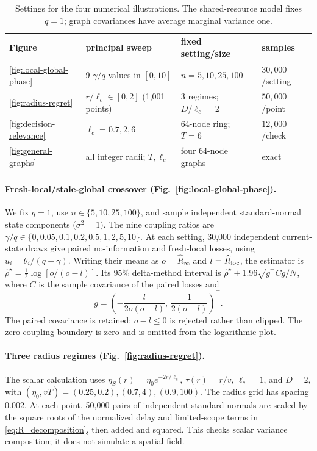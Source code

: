 \begin{table}[H]
\centering
\caption{Settings for the four numerical illustrations. The shared-resource
model fixes $q=1$; graph covariances have average marginal variance one.}
\label{tab:numerical-parameters}
\small
\begin{tabular}{llll}
\toprule
Figure & principal sweep & fixed setting/size & samples \\
\midrule
\ref{fig:local-global-phase} & 9 $\gamma/q$ values in $[0,10]$ & $n=5,10,25,100$ & $30{,}000$/setting \\
\ref{fig:radius-regret} & $r/\ell_c\in[0,2]$ (1,001 points) & 3 regimes; $D/\ell_c=2$ & $50{,}000$/point \\
\ref{fig:decision-relevance} & $\ell_c=0.7,2,6$ & 64-node ring; $T=6$ & $12{,}000$/check \\
\ref{fig:general-graphs} & all integer radii; $T,\ell_c$ & four 64-node graphs & exact \\
\bottomrule
\end{tabular}
\end{table}

\paragraph{Fresh-local/stale-global crossover (Fig.~\ref{fig:local-global-phase}).}
We fix $q=1$, use $n\in\{5,10,25,100\}$, and sample independent
standard-normal state components ($\sigma^2=1$).
The nine coupling ratios are $\gamma/q\in\{0,0.05,0.1,0.2,0.5,1,2,5,10\}$.
At each setting, 30,000 independent current-state draws give paired no-information and fresh-local
losses, using $u_i=\theta_i/(q+\gamma)$.
Writing their means as $o=\widehat R_\infty$ and
$l=\widehat R_{\rm loc}$, the estimator is
$\widehat\rho^\star=\tfrac12\log[o/(o-l)]$.
Its 95\% delta-method interval is
$\widehat\rho^\star\pm1.96\sqrt{g^\top Cg/N}$, where $C$ is the sample
covariance of the paired losses and
\[
g=\left(-\frac{l}{2o(o-l)},\,\frac{1}{2(o-l)}\right)^\top.
\]
The paired covariance is retained; $o-l\le0$ is rejected rather than clipped.
The zero-coupling boundary is zero and is omitted from the logarithmic plot.

\paragraph{Three radius regimes (Fig.~\ref{fig:radius-regret}).}
The scalar calculation uses $\eta_S(r)=\eta_0e^{-2r/\ell_c}$,
$\tau(r)=r/v$, $\ell_c=1$, and $D=2$, with
$(\eta_0,vT)=(0.25,0.2),(0.7,4),(0.9,100)$.
The radius grid has spacing 0.002. At each point, 50,000 pairs of independent
standard normals are scaled by the square roots of the normalized delay and limited-scope terms in
\eqref{eq:R_decomposition}, then added
and squared. This checks scalar variance composition; it does not simulate
a spatial field.

